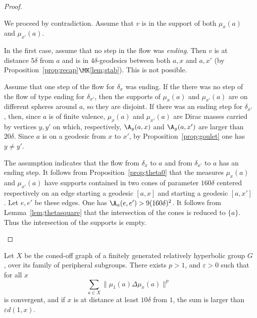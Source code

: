 \begin{proof}
\begin{step}[\eqref{2.12.1}]
We proceed by contradiction. Assume that $v$ is in the support of both $\mu_x(a)$ and $\mu_{x'}(a) $.

In the first case, assume that no step in the flow was \emph{ending}. Then $v$ is at distance $5\delta$ from $a$ and is in $4\delta$-geodesics between both $a,x$ and $a,x'$ (by Proposition~\ref{prop;recap}$\MK$\eqref{lem;stab}). This is not possible.

Assume that one step of the flow for $\delta_x$ was ending. If the there was no step of the flow of type ending for $\delta_{x'}$, then the supports of $\mu_x(a)$ and $\mu_{x'}(a)$ are on different spheres around $a$, so they are disjoint. If there was an ending step for $\delta_{x'}$, then, since $a$ is of finite valence, $\mu_x(a)$ and $\mu_{x'}(a)$ are Dirac masses carried by vertices $y,y'$ on which, respectively, $\A_y(a,x)$ and $\A_y(a,x')$ are larger than $20\delta$. Since $a$ is on a geodesic from $x$ to $x'$, by Proposition~\ref{prop;goulet} one has $y\neq y'$.
\end{step}

\begin{laststep}[\eqref{2.12.2}]
The assumption indicates that the flow from $\delta_x$ to $a$ and from $\delta_{x'}$ to $a$ has an ending step. It follows from Proposition~\ref{prop;theta0} that the measures $\mu_x(a)$ and $ \mu_{x'}(a)$ have supports contained in two cones of parameter $160\delta$ centered respectively on an edge starting a geodesic $[a,x]$ and starting a geodesic $[a,x']$. Let $e,e'$ be these edges. One has $\A_a(e,e') > 9 (160\delta)^2$. It follows from Lemma~\ref{lem;thetasquare} that the intersection of the cones is reduced to $\{a\}$. Thus the intersection of the supports is empty.
\end{laststep}
\let\qed\relax
\end{proof}

\begin{coro}\label{cor;ALconique}
Let $X$ be the coned-off graph of a finitely generated relatively hyperbolic group $G$, over its family of peripheral subgroups. There exists $p>1$, and $\varepsilon >0$ such that for all $x$
\[
\sum_{a\in X} \| \mu_1(a) \Delta \mu_{x}(a) \|^p
\]
is convergent, and if $x$ is at distance at least $10\delta$ from $1$, the sum is larger than $\varepsilon d(1,x)$.
\end{coro}


